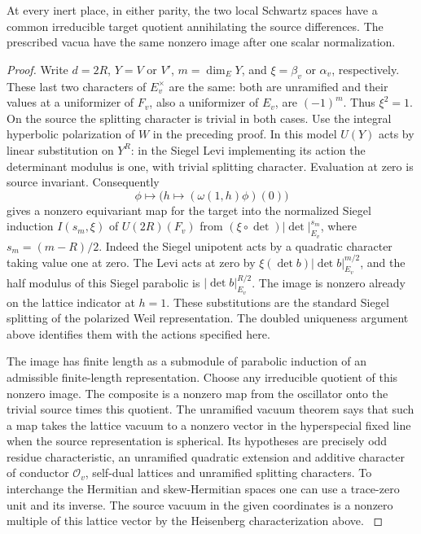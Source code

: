 \begin{proposition}
\label{threal:allinert}
At every inert place, in either parity, the two local Schwartz spaces
have a common irreducible target quotient annihilating the source
differences. The prescribed vacua have the same nonzero image after
one scalar normalization.
\end{proposition}
\begin{proof}
Write \(d=2R\), \(Y=V\) or \(V'\), \(m=\dim_EY\), and
\(\xi=\beta_v\) or \(\alpha_v\), respectively. These last two
characters of \(E_v^\times\) are the same: both are unramified
and their values at a uniformizer of \(F_v\), also a uniformizer
of \(E_v\), are \((-1)^m\). Thus \(\xi^2=1\). On the source the
splitting character is trivial in both cases. Use the integral
hyperbolic polarization of \(W\) in the preceding proof. In this
model \(U(Y)\) acts by linear substitution on \(Y^R\): in the
Siegel Levi implementing its action the determinant modulus is
one, with trivial splitting character. Evaluation at zero is
source invariant. Consequently
\[
        \phi\longmapsto
          \bigl(h\longmapsto(\omega(1,h)\phi)(0)\bigr)
\]
gives a nonzero equivariant map for the target into the normalized
Siegel induction \(I(s_m,\xi)\) of \(U(2R)(F_v)\) from
\((\xi\circ\det)|\det|_{E_v}^{s_m}\),
where \(s_m=(m-R)/2\). Indeed the Siegel unipotent acts by a
quadratic character taking value one at zero. The Levi acts at
zero by \(\xi(\det b)|\det b|_{E_v}^{m/2}\), and the half modulus
of this Siegel parabolic is \(|\det b|_{E_v}^{R/2}\).
The image is nonzero already on the lattice indicator at \(h=1\).
These substitutions are the standard Siegel splitting of the
polarized Weil representation. The doubled uniqueness argument
above identifies them with the actions specified here.

The image has finite length as a submodule of parabolic induction
of an admissible finite-length representation. Choose any
irreducible quotient of this nonzero image. The composite is a
nonzero map from the oscillator onto the trivial source times
this quotient. The unramified vacuum theorem says that such a map
takes the lattice vacuum to a nonzero vector in the hyperspecial
fixed line when the source representation is spherical. Its
hypotheses are precisely odd residue characteristic, an unramified
quadratic extension and additive character of conductor \(\mathcal
O_v\), self-dual lattices and unramified splitting characters. To
interchange the Hermitian and skew-Hermitian spaces one can use a
trace-zero unit and its inverse. The source vacuum in the given
coordinates is a nonzero multiple of this lattice vector by the
Heisenberg characterization above.
\cite[Appendix, Theorem~2.A.1]{harrisSpherical}


\end{proof}
